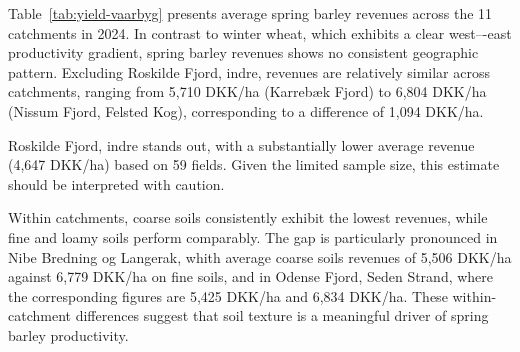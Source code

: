 \documentclass[12pt]{article}
\begin{document}
Table~\ref{tab:yield-vaarbyg} presents average spring barley revenues across the 11 catchments in 2024. 
In contrast to winter wheat, which exhibits a clear west–-east productivity gradient, spring barley revenues shows no consistent geographic pattern. 
Excluding Roskilde Fjord, indre, revenues are relatively similar across catchments, ranging from 5,710 DKK/ha (Karrebæk Fjord) to 6,804 DKK/ha (Nissum Fjord, Felsted Kog), corresponding to a difference of 1,094 DKK/ha. 

Roskilde Fjord, indre stands out, with a substantially lower average revenue (4,647 DKK/ha) based on 59 fields. Given the limited sample size, this estimate should be interpreted with caution.

Within catchments, coarse soils consistently exhibit the lowest revenues, while fine and loamy soils perform comparably. 
The gap is particularly pronounced in Nibe Bredning og Langerak, whith average coarse soils revenues of 5,506 DKK/ha against 6,779 DKK/ha on fine soils, and in Odense Fjord, Seden Strand, where the corresponding figures are 5,425 DKK/ha and 6,834 DKK/ha. 
These within-catchment differences suggest that soil texture is a meaningful driver of spring barley productivity. 
\end{document}
